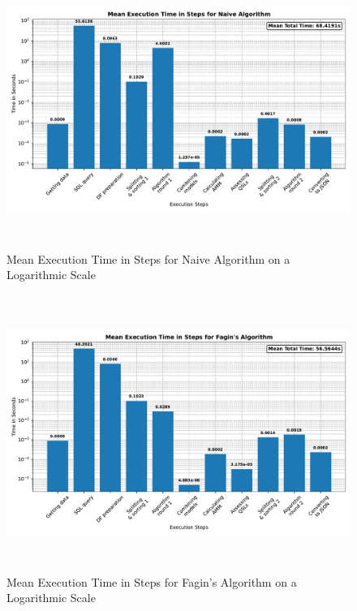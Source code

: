\begin{figure}[htbp]
    \centering
    \includegraphics[height=9cm]{plots/executiontime_naive.pdf}
    \caption{Mean Execution Time in Steps for Naive Algorithm on a Logarithmic Scale}
    \label{fig:timenaive}
  \end{figure}

  \begin{figure}[htbp]
    \centering
    \includegraphics[height=9cm]{plots/executiontime_fagins.pdf}
    \caption{Mean Execution Time in Steps for Fagin's Algorithm on a Logarithmic Scale}
    \label{fig:timefagin}
  \end{figure}

